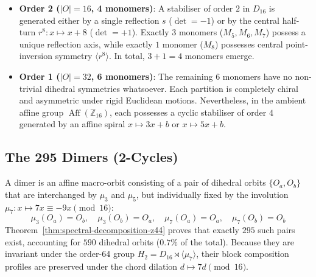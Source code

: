 \begin{itemize}
    \item \textbf{Order 2 ($|O| = 16$, 4 monomers)}:
    A stabiliser of order $2$ in $D_{16}$ is generated either by a single reflection $s$ ($\det = -1$) or by the central half-turn $r^8 \colon x \mapsto x + 8$ ($\det = +1$). Exactly $3$ monomers ($M_5, M_6, M_7$) possess a unique reflection axis, while exactly $1$ monomer ($M_8$) possesses central point-inversion symmetry $\langle r^8 \rangle$. In total, $3 + 1 = 4$ monomers emerge.
    
    \item \textbf{Order 1 ($|O| = 32$, 6 monomers)}:
    The remaining $6$ monomers have no non-trivial dihedral symmetries whatsoever. Each partition is completely chiral and asymmetric under rigid Euclidean motions. Nevertheless, in the ambient affine group $\operatorname{Aff}(\mathbb{Z}_{16})$, each possesses a cyclic stabiliser of order $4$ generated by an affine spiral $x \mapsto 3x + b$ or $x \mapsto 5x + b$.
\end{itemize}

\subsection{The 295 Dimers (2-Cycles)}

A dimer is an affine macro-orbit consisting of a pair of dihedral orbits $\{O_a, O_b\}$ that are interchanged by $\mu_3$ and $\mu_5$, but individually fixed by the involution $\mu_7 \colon x \mapsto 7x \equiv -9x \pmod{16}$:
\begin{equation}
\label{eqn:dimer-action}
\mu_3(O_a) = O_b, \quad \mu_3(O_b) = O_a, \quad \mu_7(O_a) = O_a, \quad \mu_7(O_b) = O_b
\end{equation}
Theorem~\ref{thm:spectral-decomposition-z44} proves that exactly $295$ such pairs exist, accounting for $590$ dihedral orbits ($0.7\%$ of the total). Because they are invariant under the order-64 group $H_2 = D_{16} \rtimes \langle \mu_7 \rangle$, their block composition profiles are preserved under the chord dilation $d \mapsto 7d \pmod{16}$.
